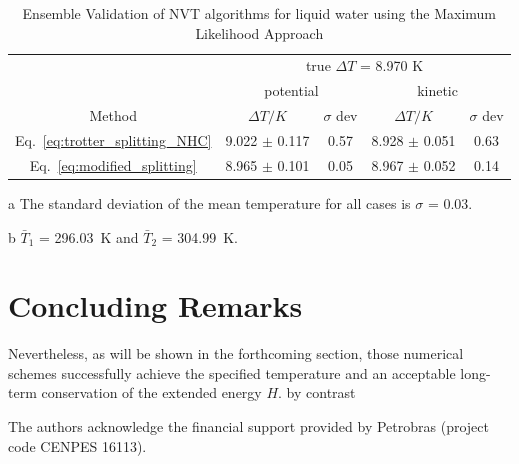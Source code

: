 \documentclass[aip,jcp,reprint,amsmath,amssymb]{revtex4-1}
\begin{document}
\begin{table}
	\begin{threeparttable}
		\caption{Ensemble Validation of NVT algorithms for liquid water using the Maximum Likelihood Approach  }
		\label{table:ensemblevalidation}
		\begin{ruledtabular}
			\begin{tabular}{ccccc}
				& \multicolumn{4}{c}{true $\Delta T$ = 8.970 K} \\
				\cline{2-5}
				& \multicolumn{2}{c}{potential} & \multicolumn{2}{c}{kinetic}\\
				\hline
				Method  &$\Delta T/K$ & $\sigma$ dev & $\Delta T/K$ & $\sigma$ dev \\
				\hline %
				Eq.~\eqref{eq:trotter_splitting_NHC} & 9.022 $\pm$ 0.117 & 0.57 & 8.928 $\pm$ 0.051 & 0.63 \\
				Eq.~\eqref{eq:modified_splitting}    & 8.965 $\pm$ 0.101 & 0.05 & 8.967 $\pm$ 0.052 & 0.14
		\end{tabular}
		\end{ruledtabular}
		\begin{tablenotes}
			\item[a] The standard deviation of the mean temperature for all cases is $\sigma$ = 0.03.
			\item[b] $\bar{T}_1$ = 296.03~K and $\bar{T}_2$ = 304.99~K.
		\end{tablenotes}
	\end{threeparttable}
\end{table}



\section{Concluding Remarks}
\label{sec:conclusion}
Nevertheless, as will be shown in the forthcoming section, those numerical schemes successfully achieve the specified temperature and an acceptable long-term conservation of the extended energy $H$. 
by contrast
\begin{acknowledgments}
The authors acknowledge the financial support provided by Petrobras (project code CENPES 16113).
\end{acknowledgments}
\end{document}

